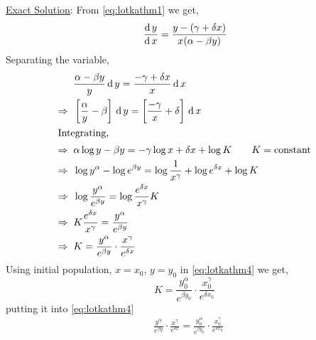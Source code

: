 \documentclass[../main-sheet.tex]{subfiles}
\begin{document}
\begin{soln}
    \begin{figure}[H]
        \centering
    \end{figure}
    \underline{Exact Solution}: From \eqref{eq:lotkathm1} we get,
    \[\,\frac{\mathrm{d}\,y}{\mathrm{d}\,x}=\frac{y-(\gamma+\delta x)}{x(\alpha-\beta y)}\]
    Separating the variable,
    \begin{align}
        &\frac{\alpha-\beta y}{y}\,\mathrm{d}\, y=\frac{-\gamma+\delta x}{x}\,\mathrm{d}\, x\notag\\
        \Rightarrow\;\;&\left[\frac{\alpha}{y}-\beta \right]\,\mathrm{d}\, y=\left[\frac{-\gamma}{x}+\delta\right]\,\mathrm{d}\, x\notag\\
        \intertext{Integrating,}
        \Rightarrow\;\;&\alpha \log y-\beta y=-\gamma \log x+\delta x+\log K\qquad K=\text{constant}\notag\\
        \Rightarrow\;\;&\log y^\alpha-\log e^{\beta y}=\log \frac{1}{x^{\gamma }}+\log e^{\delta x}+\log K\notag\\
        \Rightarrow\;\;&\log \frac{y^\alpha}{e^{\beta y}}=\log \frac{e^{\delta x}}{x^{\gamma }}K\notag\\
        \Rightarrow\;\;&K\frac{e^{\delta x}}{x^{\gamma }}=\frac{y^\alpha}{e^{\beta y}}\notag\\
        \Rightarrow\;\;&K=\frac{y^\alpha}{e^{\beta y}}\cdot \frac{x^{\gamma }}{e^{\delta x}}\label{eq:lotkathm4}
    \end{align}
    Using initial population, \(x=x_0\), \(y=y_0\) in \eqref{eq:lotkathm4} we get,
    \[
        K=\frac{y_0^\alpha}{e^{\beta y_0}}\cdot \frac{x_0^{\gamma }}{e^{\delta x_0}}
    \]
    putting it into \eqref{eq:lotkathm4}
    \begin{align*}
        &\frac{y^\alpha}{e^{\beta y}}\cdot \frac{x^{\gamma }}{e^{\delta x}}=\frac{y_0^\alpha}{e^{\beta y_0}}\cdot \frac{x_0^{\gamma }}{e^{\delta x_0}}\\

\end{align*}
\end{soln}
\end{document}
